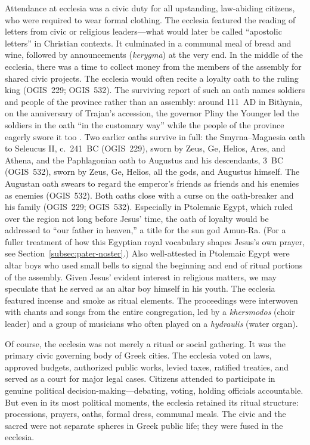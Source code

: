 Attendance at ecclesia was a civic duty for all upstanding, law-abiding citizens, who were required to wear formal clothing.
The ecclesia featured the reading of letters from civic or religious leaders---what would later be called ``apostolic letters'' in Christian contexts.
It culminated in a communal meal of bread and wine, followed by announcements (\emph{kerygma}) at the very end.
In the middle of the ecclesia, there was a time to collect money from the members of the assembly for shared civic projects.
The ecclesia would often recite a loyalty oath to the ruling king (OGIS~229; OGIS~532).
The surviving report of such an oath names soldiers and people of the province rather than an assembly: around 111~AD in Bithynia, on the anniversary of Trajan's accession, the governor Pliny the Younger led the soldiers in the oath ``in the customary way'' while the people of the province eagerly swore it too \cite[10.52]{pliny:letters}.
Two earlier oaths survive in full: the Smyrna--Magnesia oath to Seleucus II, c.~241~BC (OGIS~229), sworn by Zeus, Ge, Helios, Ares, and Athena, and the Paphlagonian oath to Augustus and his descendants, 3~BC (OGIS~532), sworn by Zeus, Ge, Helios, all the gods, and Augustus himself.
The Augustan oath swears to regard the emperor's friends as friends and his enemies as enemies (OGIS~532).
Both oaths close with a curse on the oath-breaker and his family (OGIS~229; OGIS~532).
Especially in Ptolemaic Egypt, which ruled over the region not long before Jesus' time, the oath of loyalty would be addressed to ``our father in heaven,'' a title for the sun god Amun-Ra.
(For a fuller treatment of how this Egyptian royal vocabulary shapes Jesus's own prayer, see Section~\ref{subsec:pater-noster}.)
Also well-attested in Ptolemaic Egypt were altar boys who used small bells to signal the beginning and end of ritual portions of the assembly.
Given Jesus' evident interest in religious matters, we may speculate that he served as an altar boy himself in his youth.
The ecclesia featured incense and smoke as ritual elements.
The proceedings were interwoven with chants and songs from the entire congregation, led by a \emph{khersmodos} (choir leader) and a group of musicians who often played on a \emph{hydraulis} (water organ).

Of course, the ecclesia was not merely a ritual or social gathering.
It was the primary civic governing body of Greek cities.
The ecclesia voted on laws, approved budgets, authorized public works, levied taxes, ratified treaties, and served as a court for major legal cases.
Citizens attended to participate in genuine political decision-making---debating, voting, holding officials accountable.
But even in its most political moments, the ecclesia retained its ritual structure: processions, prayers, oaths, formal dress, communal meals.
The civic and the sacred were not separate spheres in Greek public life; they were fused in the ecclesia.

